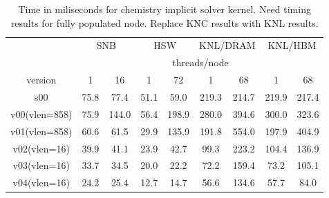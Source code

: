 \begin{table}
\begin{center}
\begin{tabular}{|c|c|c|c|c|c|c|c|c|}
\hline
        & \multicolumn{2}{c|}{SNB} & \multicolumn{2}{c|}{HSW} & \multicolumn{2}{c|}{KNL/DRAM} & \multicolumn{2}{c|}{KNL/HBM} \\
        & \multicolumn{8}{c|}{threads/node} \\
version       &    1  & 16    & 1    & 72    & 1      & 68    & 1     & 68 \\
s00           &  75.8 & 77.4  & 51.1 & 59.0  & 219.3  & 214.7 & 219.9 & 217.4  \\
v00(vlen=858) &  75.9 & 144.0 & 56.4 & 198.9 & 280.0  & 394.6 & 300.0 & 323.6  \\
v01(vlen=858) &  60.6 &  61.5 & 29.9 & 135.9 & 191.8  & 554.0 & 197.9 & 404.9  \\
v02(vlen=16)  &  39.9 &  41.1& 23.9 &  42.7 &  99.3  & 223.2 & 104.4 & 136.9 \\
v03(vlen=16)  &  33.7 &  34.5 & 20.0 &  22.2 &  72.2  & 159.4 &  73.2 & 105.1 \\
v04(vlen=16)  &  24.2 &  25.4 & 12.7 &  14.7 &  56.6  & 134.6 &  57.7 & 84.0  \\
\hline
\end{tabular}
\caption{Time in miliseconds for chemistry implicit solver kernel. {\color{red}  Need timing results for fully populated node.  Replace KNC results with KNL results.}\label{tbl:chem-timing}}
\end{center}
\end{table}
